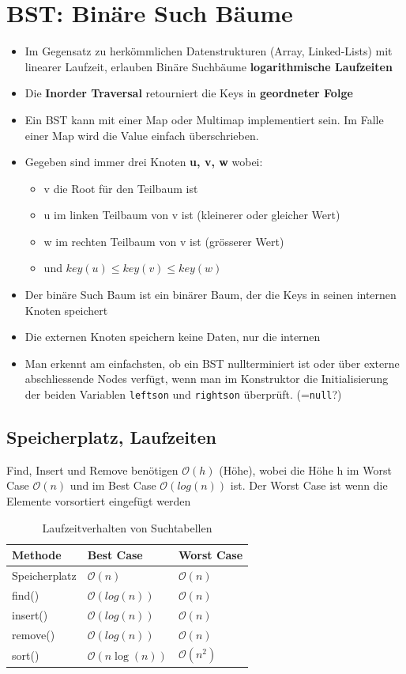 \section{BST: Binäre Such Bäume}
\begin{itemize}
	\item Im Gegensatz zu herkömmlichen Datenstrukturen (Array, Linked-Lists) mit linearer Laufzeit, erlauben Binäre Suchbäume \textbf{logarithmische Laufzeiten}
	\item Die \textbf{Inorder Traversal} retourniert die Keys in \textbf{geordneter Folge}
	\item Ein BST kann mit einer Map oder Multimap implementiert sein. Im Falle einer Map wird die Value einfach überschrieben.
	\item Gegeben sind immer drei Knoten \textbf{u, v, w} wobei:
	\begin{itemize}
		\item v die Root für den Teilbaum ist
		\item u im linken Teilbaum von v ist (kleinerer oder gleicher Wert)
		\item w im rechten Teilbaum von v ist (grösserer Wert)
		\item und $key(u) \leq key(v) \leq key(w)$
	\end{itemize}
	\item Der binäre Such Baum ist ein binärer Baum, der die Keys in seinen internen Knoten speichert
	\item Die externen Knoten speichern keine Daten, nur die internen
	\item Man erkennt am einfachsten, ob ein BST nullterminiert ist oder über externe abschliessende Nodes verfügt, wenn man im Konstruktor die Initialisierung der beiden Variablen \lstinline|leftson| und \lstinline|rightson| überprüft. (=\lstinline|null|?)
\end{itemize}


\subsection{Speicherplatz, Laufzeiten}
Find, Insert und Remove benötigen $\mathcal{O}(h)$ (Höhe), wobei die Höhe h im Worst Case $\mathcal{O}(n)$ und im Best Case $\mathcal{O}(log(n))$ ist. Der Worst Case ist wenn die Elemente vorsortiert eingefügt werden
\begin{table}[h]
	\centering
	\begin{tabu} to \linewidth {l l l}
		\toprule
		Methode & Best Case  & Worst Case \\
		\midrule
		Speicherplatz & $\mathcal{O}(n)$ & $\mathcal{O}(n)$ \\
		find() & $\mathcal{O}(log(n))$ &  $\mathcal{O}(n)$ \\
		insert() & $\mathcal{O}(log(n))$ & $\mathcal{O}(n)$ \\
		remove() & $\mathcal{O}(log(n))$ & $\mathcal{O}(n)$ \\
		sort()  & $\mathcal{O}(n\log(n))$ & $\mathcal{O}(n^2)$ \\
		\bottomrule
	\end{tabu}
	\caption{Laufzeitverhalten von Suchtabellen}
\end{table}

